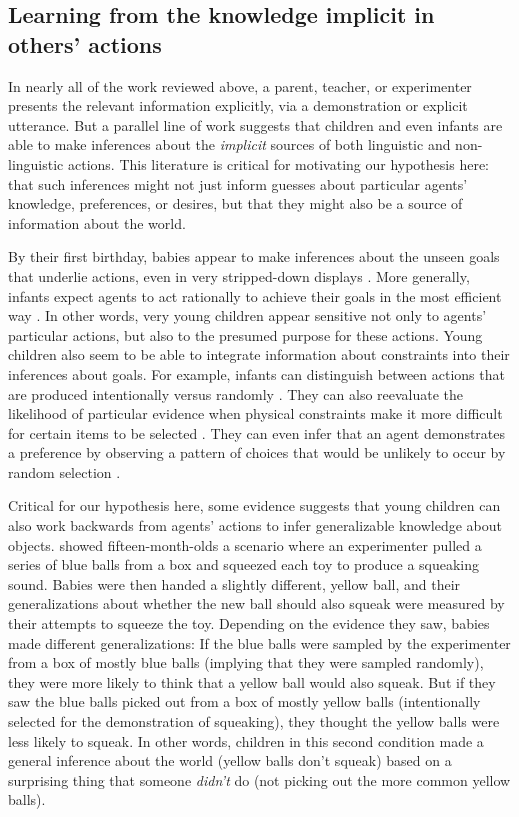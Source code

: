 \documentclass[man]{apa2}
\begin{document}
\subsection{Learning from the knowledge implicit in others' actions}

In nearly all of the work reviewed above, a parent, teacher, or experimenter presents the relevant information explicitly, via a demonstration or explicit utterance. But a parallel line of work suggests that children and even infants are able to make inferences about the \emph{implicit} sources of both linguistic and non-linguistic actions. This literature is critical for motivating our hypothesis here: that such inferences might not just inform guesses about particular agents' knowledge, preferences, or desires, but that they might also be a source of information about the world. 

By their first birthday, babies appear to make inferences about the unseen goals that underlie actions, even in very stripped-down displays \cite{gergely1995}. More generally, infants expect agents to act rationally to achieve their goals in the most efficient way \cite{csibra1998, gergely2003}. In other words, very young children appear sensitive not only to agents' particular actions, but also to the presumed purpose for these actions. Young children also seem to be able to integrate information about constraints into their inferences about goals. For example, infants can distinguish between actions that are produced intentionally versus randomly \cite{xu2009}.  They can also reevaluate the likelihood of particular evidence when physical constraints make it more difficult for certain items to be selected \cite{denison2010b}.  They can even infer that an agent demonstrates a preference by observing a pattern of choices that would be unlikely to occur by random selection \cite{kushnir2010}. 

Critical for our hypothesis here, some evidence suggests that young children can also work backwards from agents' actions to infer generalizable knowledge about objects.  showed fifteen-month-olds a scenario where an experimenter pulled a series of blue balls from a box and squeezed each toy to produce a squeaking sound. Babies were then handed a slightly different, yellow ball, and their generalizations about whether the new ball should also squeak were measured by their attempts to squeeze the toy. Depending on the evidence they saw, babies made different generalizations: If the blue balls were sampled by the experimenter from a box of mostly blue balls (implying that they were sampled randomly), they were more likely to think that a yellow ball would also squeak. But if they saw the blue balls picked out from a box of mostly yellow balls (intentionally selected for the demonstration of squeaking), they thought the yellow balls were less likely to squeak. In other words, children in this second condition made a general inference about the world (yellow balls don't squeak) based on a surprising thing that someone \emph{didn't} do (not picking out the more common yellow balls). 
\end{document}
